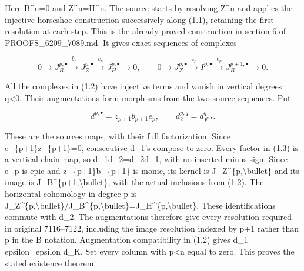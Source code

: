 Here B\textasciicircum{}n\allowbreak{}=0 and Z\textasciicircum{}n\allowbreak{}=H\textasciicircum{}n. The source starts by resolving Z\^{}n and applies the injective horseshoe construction successively along (1.1)\allowbreak{},\allowbreak{} retaining the first resolution at each step. This is the already proved construction in section 6 of PROOFS\_\allowbreak{}6209\_\allowbreak{}7089.md. It gives exact sequences of complexes

\[
 0\to J_B^{p,\bullet}\xrightarrow{b_p}J_Z^{p,\bullet}
       \xrightarrow{c_p}J_H^{p,\bullet}\to0,\qquad
 0\to J_Z^{p,\bullet}\xrightarrow{z_p}I^{p,\bullet}
       \xrightarrow{e_p}J_B^{p+1,\bullet}\to0.                   \tag{1.2}
\]

All the complexes in (1.2)\allowbreak{} have injective terms and vanish in vertical degrees q\textless0. Their augmentations form morphisms from the two source sequences. Put

\[
 d_1^{p,\bullet}=z_{p+1}b_{p+1}e_p,\qquad
 d_2^{p,q}=d_{I^{p,\bullet}}^q.                                \tag{1.3}
\]

These are the source\textquotesingle s maps,\allowbreak{} with their full factorization. Since e\_\allowbreak{}\{p\allowbreak{}+1\}z\_\allowbreak{}\{p\allowbreak{}+1\}\allowbreak{}=0,\allowbreak{} consecutive d\_\allowbreak{}1's compose to zero. Every factor in (1.3)\allowbreak{} is a vertical chain map,\allowbreak{} so d\_\allowbreak{}1d\_\allowbreak{}2\allowbreak{}=d\_\allowbreak{}2d\_\allowbreak{}1,\allowbreak{} with no inserted minus sign. Since e\_\allowbreak{}p is epic and z\_\allowbreak{}\{p\allowbreak{}+1\}b\_\allowbreak{}\{p\allowbreak{}+1\} is monic,\allowbreak{} its kernel is J\_\allowbreak{}Z\textasciicircum{}\{p,\allowbreak{}\textbackslash{}bullet\} and its image is J\_\allowbreak{}B\textasciicircum{}\{p\allowbreak{}+1,\allowbreak{}\textbackslash{}bullet\},\allowbreak{} with the actual inclusions from (1.2)\allowbreak{}. The horizontal cohomology in degree p is J\_\allowbreak{}Z\textasciicircum{}\{p,\allowbreak{}\textbackslash{}bullet\}/\allowbreak{}J\_\allowbreak{}B\textasciicircum{}\{p,\allowbreak{}\textbackslash{}bullet\}\allowbreak{}=J\_\allowbreak{}H\textasciicircum{}\{p,\allowbreak{}\textbackslash{}bullet\}. These identifications commute with d\_\allowbreak{}2. The augmentations therefore give every resolution required in original 7116–\allowbreak{}7122,\allowbreak{} including the image resolution indexed by p\allowbreak{}+1 rather than p in the B notation. Augmentation compatibility in (1.2)\allowbreak{} gives d\_\allowbreak{}1 epsilon\allowbreak{}=epsilon d\_\allowbreak{}K. Set every column with p\textless n equal to zero. This proves the stated existence theorem.

